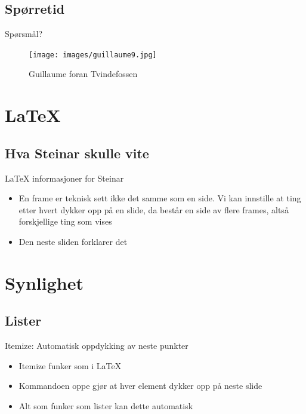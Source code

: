 \subsection*{Spørretid}
\begin{frame}{Spørsmål?}
    \begin{figure}
        \centering
        \texttt{[image: images/guillaume9.jpg]}
        \caption{Guillaume foran Tvindefossen}
        \label{fig:guillaume9}
    \end{figure}
\end{frame}

\section{LaTeX}
\subsection*{Hva Steinar skulle vite}
\begin{frame}{LaTeX informasjoner for Steinar}
\begin{itemize}
    \item En frame er teknisk sett ikke det samme som en side. Vi kan innstille at ting etter hvert dykker opp på en slide, da består en side av flere frames, altså forskjellige ting som vises
    \item Den neste sliden forklarer det
\end{itemize}
\end{frame}

\section{Synlighet}
\subsection{Lister}
\begin{frame}{Itemize: Automatisk oppdykking av neste punkter}
\begin{itemize}[<+->]
    \item Itemize funker som i LaTeX
    \item Kommandoen oppe gjør at hver element dykker opp på neste slide
    \item Alt som funker som lister kan dette automatisk
\end{itemize}

\end{frame}

